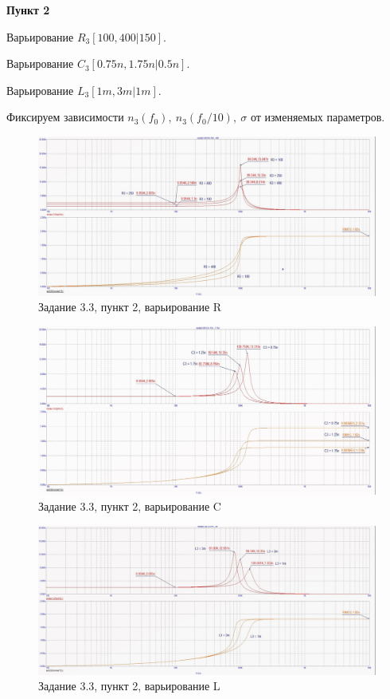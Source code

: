 \documentclass[a4paper, 14pt]{extarticle}%
\begin{document}
\textbf{Пункт 2}

Варьирование $R_3[100, 400 | 150]$.

Варьирование $C_3[0.75n, 1.75n | 0.5n]$.

Варьирование $L_3[1m, 3m | 1m]$.

Фиксируем зависимости $n_3(f_0), \: n_3(f_0/10), \: \sigma$ от изменяемых параметров.


\begin{figure}[h!]
			\centering
			\includegraphics[width=1.1\linewidth]{3/3_3_5.jpg}
			\caption{Задание 3.3, пункт 2, варьирование R}
			\label{A}
\end{figure}



\begin{figure}[h!]
			\centering
			\includegraphics[width=1.1\linewidth]{3/3_3_3.jpg}
			\caption{Задание 3.3, пункт 2, варьирование C}
			\label{A}
\end{figure}



\begin{figure}[h!]
			\centering
			\includegraphics[width=1.1\linewidth]{3/3_3_4.jpg}
			\caption{Задание 3.3, пункт 2, варьирование L}
			\label{A}
\end{figure}
\end{document}
